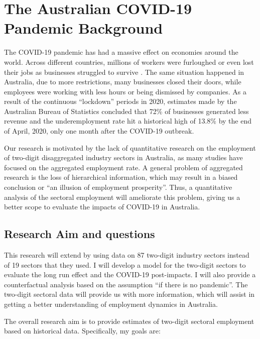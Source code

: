 \documentclass{monashthesis}
\begin{document}
\hypertarget{the-australian-covid-19-pandemic-background}{%
\chapter{The Australian COVID-19 Pandemic Background}\label{the-australian-covid-19-pandemic-background}}

The COVID-19 pandemic has had a massive effect on economies around the world. Across different countries, millions of workers were furloughed or even lost their jobs as businesses struggled to survive \autocite{ny2020}. The same situation happened in Australia, due to more restrictions, many businesses closed their doors, while employees were working with less hours or being dismissed by companies. As a result of the continuous ``lockdown'' periods in 2020, estimates made by the Australian Bureau of Statistics \autocite{ABS2021} concluded that 72\% of businesses generated less revenue and the underemployment rate hit a historical high of 13.8\% by the end of April, 2020, only one month after the COVID-19 outbreak.

Our research is motivated by the lack of quantitative research on the employment of two-digit disaggregated industry sectors in Australia, as many studies have focused on the aggregated employment rate. A general problem of aggregated research is the loss of hierarchical information, which may result in a biased conclusion or ``an illusion of employment prosperity''. Thus, a quantitative analysis of the sectoral employment will ameliorate this problem, giving us a better scope to evaluate the impacts of COVID-19 in Australia.

\hypertarget{research-aim-and-questions}{%
\section{Research Aim and questions}\label{research-aim-and-questions}}

This research will extend \textcite{anderson2020} by using data on 87 two-digit industry sectors instead of 19 sectors that they used. I will develop a model for the two-digit sectors to evaluate the long run effect and the COVID-19 post-impacts. I will also provide a counterfactual analysis based on the assumption ``if there is no pandemic''. The two-digit sectoral data will provide us with more information, which will assist in getting a better understanding of employment dynamics in Australia.

The overall research aim is to provide estimates of two-digit sectoral employment based on historical data. Specifically, my goals are:
\end{document}
